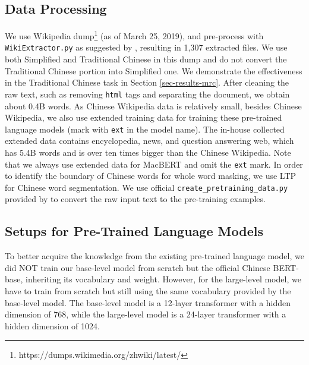 \documentclass[journal]{IEEEtran}
\begin{document}
\begin{CJK*}{UTF8}{gbsn}
\subsection{Data Processing}
We use Wikipedia dump\footnote{https://dumps.wikimedia.org/zhwiki/latest/} (as of March 25, 2019), and pre-process with {\tt WikiExtractor.py} as suggested by \cite{devlin-etal-2019-bert}, resulting in 1,307 extracted files. 
We use both Simplified and Traditional Chinese in this dump and do not convert the Traditional Chinese portion into Simplified one. We demonstrate the effectiveness in the Traditional Chinese task in Section \ref{sec-results-mrc}.
After cleaning the raw text, such as removing {\tt html} tags and separating the document, we obtain about 0.4B words.
As Chinese Wikipedia data is relatively small, besides Chinese Wikipedia, we also use extended training data for training these pre-trained language models (mark with {\tt ext} in the model name).
The in-house collected extended data contains encyclopedia, news, and question answering web, which has 5.4B words and is over ten times bigger than the Chinese Wikipedia.
Note that we always use extended data for MacBERT and omit the {\tt ext} mark.
In order to identify the boundary of Chinese words for whole word masking, we use LTP \cite{che2010ltp} for Chinese word segmentation.
We use official {\tt create\_pretraining\_data.py} provided by \cite{devlin-etal-2019-bert} to convert the raw input text to the pre-training examples.

\subsection{Setups for Pre-Trained Language Models}
To better acquire the knowledge from the existing pre-trained language model, we did NOT train our base-level model from scratch but the official Chinese BERT-base, inheriting its vocabulary and weight.
However, for the large-level model, we have to train from scratch but still using the same vocabulary provided by the base-level model.
The base-level model is a 12-layer transformer with a hidden dimension of 768, while the large-level model is a 24-layer transformer with a hidden dimension of 1024.


\end{CJK*}
\end{document}
